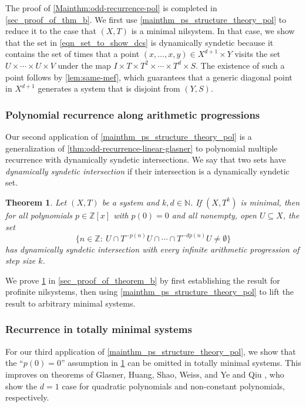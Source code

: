 \documentclass{article}
\theoremstyle{plain}
\theoremstyle{claim}
\theoremstyle{definition}
\theoremstyle{plain}
\newcounter{MainTheoremCounter}
\newtheorem{Maintheorem}[MainTheoremCounter]{Theorem}
\theoremstyle{plain}
\newcommand{\N}{\mathbb{N}}
\newcommand{\Z}{\mathbb{Z}}
\newcommand{\1}{\boldsymbol{1}}
\begin{document}
The proof of \cref{Mainthm:odd-recurrence-pol} is completed in \cref{sec_proof_of_thm_b}.  We first use \cref{mainthm_ps_structure_theory_pol} to reduce it to the case that $(X,T)$ is a minimal nilsystem.  In that case, we show that the set in \eqref{eqn_set_to_show_dcs} is dynamically syndetic because it contains the set of times that a point $(x, \ldots, x, y) \in X^{d+1} \times Y$ visits the set $U \times \cdots \times U \times V$ under the map $I \times T \times T^2 \times \cdots \times T^d \times S$. The existence of such a point follows by \cref{lem:same-mef}, which guarantees that a generic diagonal point in $X^{d+1}$ generates a system that is disjoint from $(Y,S)$.

\subsubsection{Polynomial recurrence along arithmetic progressions}

Our second application of \cref{mainthm_ps_structure_theory_pol} is a generalization of \cref{thm:odd-recurrence-linear-glasner} to   polynomial multiple recurrence with dynamically syndetic intersections.  We say that two sets have {\it dynamically syndetic intersection} if their intersection is a dynamically syndetic set.

\begin{Maintheorem}
\label{cor:pol_k_p}
Let $(X,T)$ be a system and $k, d \in \N$. If $(X,T^k)$ is minimal, then for all polynomials $p \in \Z[x]$ with $p(0) = 0$ and all nonempty, open $U \subseteq X$, the set
\[\big\{ n \in \Z: \ U \cap T^{-p(n)} U \cap \cdots \cap T^{-dp(n)} U \neq \emptyset \big\}\]
has dynamically syndetic intersection with every infinite arithmetic progression of step size $k$.
\end{Maintheorem}

We prove \cref{cor:pol_k_p} in \cref{sec_proof_of_theorem_b} by first establishing the result for profinite nilsystems, then using \cref{mainthm_ps_structure_theory_pol} to lift the result to arbitrary minimal systems.

\subsubsection{Recurrence in totally minimal systems}

For our third application of \cref{mainthm_ps_structure_theory_pol}, we show that the ``$p(0) = 0$'' assumption in \cref{cor:pol_k_p} can be omitted in totally minimal systems.  This improves on theorems of Glasner, Huang, Shao, Weiss, and Ye \cite[Cor. 6.3]{glasner_huang_shao_weiss_ye_2020} and Qiu \cite[cf. Theorem A]{Qiu23}, who show the $d=1$ case for quadratic polynomials and non-constant polynomials, respectively.
\end{document}
